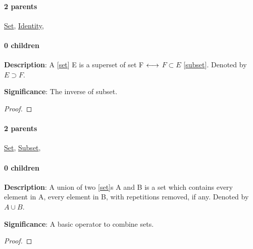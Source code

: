 \documentclass[../main.tex]{subfiles}
\begin{document}
\paragraph{2 parents} \hyperref[statement:Set]{Set}, \hyperref[statement:Identity]{Identity}, 
\paragraph{0 children} 



\begin{statement}
\label{statement:Proper Superset}\hspace*{0pt}\par
\end{statement}
\textbf{Description}:
A [\hyperref[statement:Set]{set}] E is a superset of set F $ \longleftrightarrow $ $ F \subset E $ [\hyperref[statement:Subset]{subset}]. Denoted by $ E \supset F $.
\par
{\color{magenta} \textbf{Significance}:
The inverse of subset.
\par}
\begin{proof}
\proofbydefinition
\end{proof}\par
\paragraph{2 parents} \hyperref[statement:Set]{Set}, \hyperref[statement:Subset]{Subset}, 
\paragraph{0 children} 


\begin{statement}
\label{statement:Union}\hspace*{0pt}\par
\end{statement}
\textbf{Description}:
A union of two [\hyperref[statement:Set]{set}]s A and B is a set which contains every element in A, every element in B, with repetitions removed, if any. Denoted by $ A \cup B $.
\par
{\color{magenta} \textbf{Significance}:
A basic operator to combine sets.
\par}
\begin{proof}
\proofbydefinition
\end{proof}\par
\end{document}
